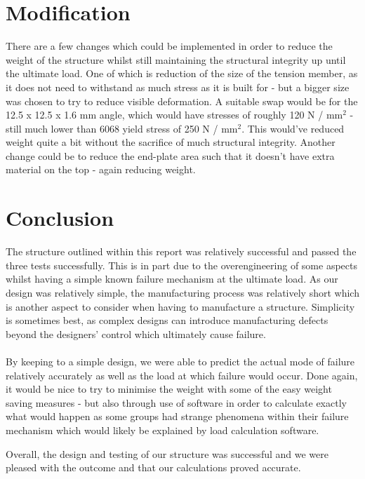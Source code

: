 \documentclass[12pt]{article}
\begin{document}
    \section{Modification}
        There are a few changes which could be implemented in order to reduce the weight of the structure whilst still maintaining the structural integrity up until the ultimate load.
        One of which is reduction of the size of the tension member, as it does not need to withstand as much stress as it is built for - but a bigger size was chosen to try to
        reduce visible deformation. A suitable swap would be for the 12.5 x 12.5 x 1.6 mm angle, which would have stresses of roughly 120 N / mm$^2$ - still much lower than 6068 yield stress of
        250 N / mm$^2$. This would've reduced weight quite a bit without the sacrifice of much structural integrity. Another change could be to reduce the end-plate area such that
        it doesn't have extra material on the top - again reducing weight.
    \section{Conclusion}
        The structure outlined within this report was relatively successful and passed the three tests successfully. This is in part due to the overengineering of some aspects whilst
        having a simple known failure mechanism at the ultimate load. As our design was relatively simple, the manufacturing process was relatively short which is another aspect to consider
        when having to manufacture a structure. Simplicity is sometimes best, as complex designs can introduce manufacturing defects beyond the designers' control which ultimately cause failure. \\ \\


        By keeping to a simple design, we were able to predict the actual mode of failure relatively accurately as well as the load at which failure would occur. Done again, it would be nice to
        try to minimise the weight with some of the easy weight saving measures - but also through use of software in order to calculate exactly what would happen as some groups
        had strange phenomena within their failure mechanism which would likely be explained by load calculation software.

        Overall, the design and testing of our structure was successful and we were pleased with the outcome and that our calculations proved accurate.
\end{document}
